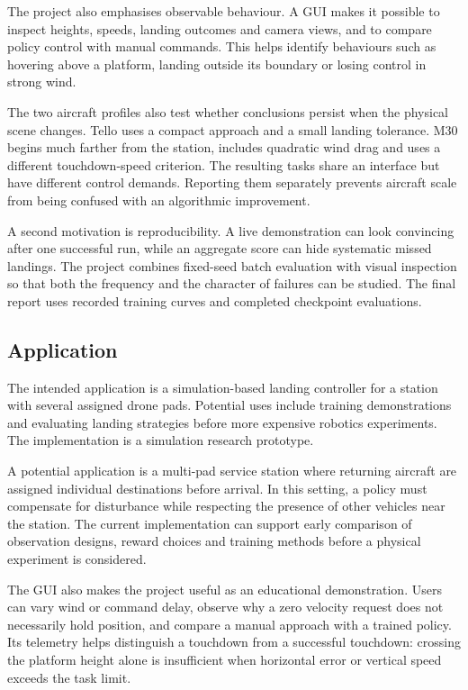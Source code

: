 The project also emphasises observable behaviour. A GUI makes it possible to inspect heights, speeds, landing outcomes and camera views, and to compare policy control with manual commands. This helps identify behaviours such as hovering above a platform, landing outside its boundary or losing control in strong wind.

The two aircraft profiles also test whether conclusions persist when the physical scene changes. Tello uses a compact approach and a small landing tolerance. M30 begins much farther from the station, includes quadratic wind drag and uses a different touchdown-speed criterion. The resulting tasks share an interface but have different control demands. Reporting them separately prevents aircraft scale from being confused with an algorithmic improvement.

A second motivation is reproducibility. A live demonstration can look convincing after one successful run, while an aggregate score can hide systematic missed landings. The project combines fixed-seed batch evaluation with visual inspection so that both the frequency and the character of failures can be studied. The final report uses recorded training curves and completed checkpoint evaluations.

\hypertarget{application}{%
\subsection{Application}\label{application}}

The intended application is a simulation-based landing controller for a station with several assigned drone pads. Potential uses include training demonstrations and evaluating landing strategies before more expensive robotics experiments. The implementation is a simulation research prototype.

A potential application is a multi-pad service station where returning aircraft are assigned individual destinations before arrival. In this setting, a policy must compensate for disturbance while respecting the presence of other vehicles near the station. The current implementation can support early comparison of observation designs, reward choices and training methods before a physical experiment is considered.

The GUI also makes the project useful as an educational demonstration. Users can vary wind or command delay, observe why a zero velocity request does not necessarily hold position, and compare a manual approach with a trained policy. Its telemetry helps distinguish a touchdown from a successful touchdown: crossing the platform height alone is insufficient when horizontal error or vertical speed exceeds the task limit.

